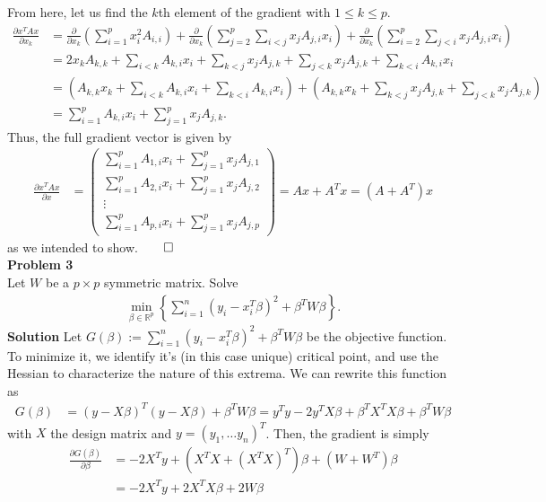 \documentclass[10pt]{article}
\newcommand{\bp}[1]{\left({#1}\right)}
\newcommand{\mbb}[1]{\mathbb{#1}}
\newcommand{\1}[1]{\mathbbm{1}_{#1}}
\begin{document}
    From here, let us find the $k$th element of the gradient with $1\leq k\leq p$.
    \begin{align*}
        \frac{\partial x^TAx}{\partial x_k}&=\frac{\partial}{\partial x_k}\bp{\sum_{i=1}^px_i^2A_{i,i}}+\frac{\partial}{\partial x_k}\bp{\sum_{j=2}^p\sum_{i<j}x_jA_{j,i}x_i}+\frac{\partial}{\partial x_k}\bp{\sum_{i=2}^p\sum_{j<i}x_jA_{j,i}x_i}\\
        &=2x_kA_{k,k}+\sum_{i<k}A_{k,i}x_i+\sum_{k<j}x_jA_{j,k}+\sum_{j<k}x_jA_{j,k}+\sum_{k<i}A_{k,i}x_i\\
        &=\bp{A_{k,k}x_k+\sum_{i<k}A_{k,i}x_i+\sum_{k<i}A_{k,i}x_i}+\bp{A_{k,k}x_k+\sum_{k<j}x_jA_{j,k}+\sum_{j<k}x_jA_{j,k}}\\
        &=\sum_{i=1}^pA_{k,i}x_i+\sum_{j=1}^px_jA_{j,k}.
    \end{align*}
    Thus, the full gradient vector is given by
    \begin{align*}
       \frac{\partial x^TAx}{\partial x}&=\begin{pmatrix}
            \sum_{i=1}^pA_{1,i}x_i+\sum_{j=1}^px_jA_{j,1}\\
            \sum_{i=1}^pA_{2,i}x_i+\sum_{j=1}^px_jA_{j,2}\\
            \vdots \\
            \sum_{i=1}^pA_{p,i}x_i+\sum_{j=1}^px_jA_{j,p}
       \end{pmatrix} = Ax+A^Tx=(A+A^T)x
    \end{align*}
    as we intended to show.\hfill{$\qed$}\\[5pt]
    {\bf Problem 3}\\[5pt]
    Let $W$ be a $p\times p$ symmetric matrix. Solve
    \begin{align*}
        \min_{\beta\in\mbb{R}^p}\left\{\sum_{i=1}^n(y_i-x_i^T\beta)^2+\beta^TW\beta\right\}.
    \end{align*}
    {\bf Solution}\hspace{5pt} Let $G(\beta):=\sum_{i=1}^n(y_i-x_i^T\beta)^2+\beta^TW\beta$ be the objective function. To minimize it, we identify it's (in this case unique) critical point, and use the Hessian to characterize the nature of this extrema. We can rewrite this function as 
    \begin{align*}
        G(\beta)&=(y-X\beta)^T(y-X\beta)+\beta^T W\beta=y^Ty-2y^TX\beta+\beta^TX^TX\beta+\beta^TW\beta
    \end{align*}
    with $X$ the design matrix and $y=(y_1,\dots y_n)^T$. Then, the gradient is simply
    \begin{align*}
        \frac{\partial G(\beta)}{\partial \beta}&=-2X^Ty+(X^TX+(X^TX)^T)\beta+(W+W^T)\beta\tag{by the previous problem}\\
        &=-2X^Ty+2X^TX\beta+2W\beta\tag{since $W^T=W$}
    \end{align*}
\end{document}
